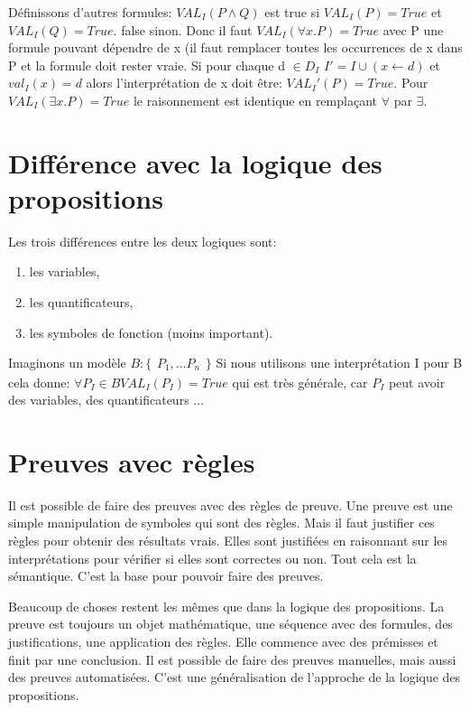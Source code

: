 Définissons d'autres formules: $VAL_{I}(P \wedge Q) $ est true si $VAL_{I}(P) = True$ et $VAL_{I}(Q) = True$. false sinon. Donc il faut $VAL_{I}(\forall x.P) = True$ avec P une formule pouvant dépendre de x (il faut remplacer toutes les occurrences de x dans P et la formule doit rester vraie. Si pour chaque d $\in D_{I}$ $ I' = I \cup (x \leftarrow d)$ et $val_{I}(x) = d$ alors l'interprétation de x doit être: $VAL_{I}'(P) = True$.
Pour $VAL_{I}(\exists x.P) = True$ le raisonnement est identique en remplaçant $\forall$ par $\exists$.
\section{Différence avec la logique des propositions}
Les trois différences entre les deux logiques sont:
\begin{enumerate}
\item les variables,
\item les quantificateurs,
\item les symboles de fonction (moins important).
\end{enumerate}  
Imaginons un modèle $B:
\{
  \begin{array}{rcr}
    P_{1},...P_{n}
  \end{array}
\}
$
Si nous utilisons une interprétation I pour B cela donne:
$\forall P_{I} \in B VAL_{I}(P_{I}) = True$ qui est très générale, car $P_{I}$ peut avoir des variables, des quantificateurs ...


\section{Preuves avec règles}

    Il est possible de faire des preuves avec des règles de preuve. Une preuve est une simple manipulation de symboles qui sont des règles. Mais il faut justifier ces règles pour obtenir des résultats vrais. Elles sont justifiées en raisonnant sur les interprétations pour vérifier si elles sont correctes ou non. Tout cela est la sémantique. C'est la base pour pouvoir faire des preuves.

Beaucoup de choses restent les mêmes que dans la logique des propositions. La preuve est toujours un objet mathématique, une séquence avec des formules, des justifications, une application des règles. Elle commence avec des prémisses et finit par une conclusion. Il est possible de faire des preuves manuelles, mais aussi des preuves automatisées. C'est une généralisation de l'approche de la logique des propositions. 

